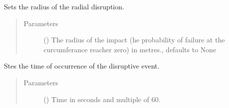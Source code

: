 \documentclass[letterpaper,10pt,english]{sphinxmanual}
\begin{document}
\begin{fulllineitems}
\begin{fulllineitems}
\begin{quote}
\begin{description}
\end{description}\end{quote}

\end{fulllineitems}


\begin{fulllineitems}
\label{\detokenize{apidoc:dreaminsg_integrated_model.src.hazard_initiator.RadialDisruption.set_radius_of_impact}}
\sphinxAtStartPar
Sets the radius of the radial disruption.
\begin{quote}\begin{description}
\item[{Parameters}] \leavevmode
\sphinxAtStartPar
{} (\sphinxstyleliteralemphasis{\sphinxupquote{, }}) \textendash{} The radius of the impact (he probability of failure at the curcumferance reacher zero) in metres., defaults to None

\end{description}\end{quote}

\end{fulllineitems}


\begin{fulllineitems}
\label{\detokenize{apidoc:dreaminsg_integrated_model.src.hazard_initiator.RadialDisruption.set_time_of_occurrence}}
\sphinxAtStartPar
Stes the time of occurrence of the disruptive event.
\begin{quote}\begin{description}
\item[{Parameters}] \leavevmode
\sphinxAtStartPar
{} () \textendash{} Time in seconds and multiple of 60.

\end{description}\end{quote}

\end{fulllineitems}


\end{fulllineitems}
\end{document}
